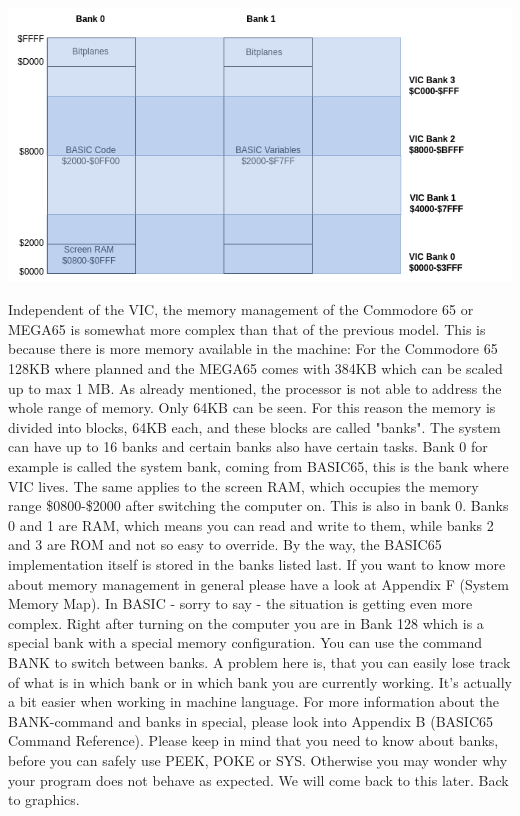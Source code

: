 \includegraphics[width=\linewidth]{images/graphics/vic-banks.png}

Independent of the VIC, the memory management of the Commodore 65 or MEGA65 is somewhat more complex than that of the previous model. This is because there is more memory available in the machine: For the Commodore 65 128KB where planned and the MEGA65 comes with 384KB which can be scaled up to max 1 MB. As already mentioned, the processor is not able to address the whole range of memory. Only 64KB can be seen. For this reason the memory is divided into blocks, 64KB each, and these blocks are called "banks". The system can have up to 16 banks and certain banks also have certain tasks. Bank 0 for example is called the system bank, coming from BASIC65, this is the bank where VIC lives. The same applies to the screen RAM, which occupies the memory range \$0800-\$2000 after switching the computer on. This is also in bank 0. Banks 0 and 1 are RAM, which means you can read and write to them, while banks 2 and 3 are ROM and not so easy to override. By the way, the BASIC65 implementation itself is stored in the banks listed last. If you want to know more about memory management in general please have a look at Appendix F (System Memory Map). In BASIC - sorry to say - the situation is getting even more complex. Right after turning on the computer you are in Bank 128 which is a special bank with a special memory configuration. You can use the command BANK to switch between banks. A problem here is, that you can easily lose track of what is in which bank or in which bank you are currently working. It's actually a bit easier when working in machine language. For more information about the BANK-command and banks in special, please look into Appendix B (BASIC65 Command Reference). Please keep in mind that you need to know about banks, before you can safely use PEEK, POKE or SYS. Otherwise you may wonder why your program does not behave as expected. We will come back to this later. Back to graphics. 


